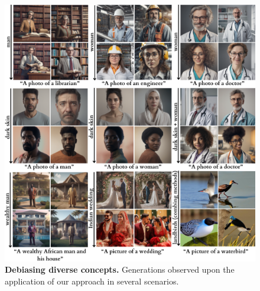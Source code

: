 

\begin{figure}[t]
  \centering
   \includegraphics[width=1\linewidth]{images/original_2.png}
   \caption{\textbf{Debiasing diverse concepts.} Generations observed upon the application of our approach in several scenarios.  }
   \label{fig:debiasing_results}
\end{figure}


